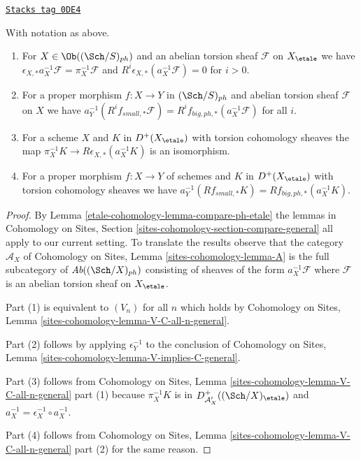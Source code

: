 \begin{lemma}
\label{etale-cohomology-lemma-V-C-all-n-etale-ph}
\href{https://stacks.math.columbia.edu/tag/0DE4}{\texttt{Stacks tag 0DE4}}

With notation as above.
\begin{enumerate}
\item For $X \in \Ob((\Sch/S)_{ph})$ and an abelian torsion sheaf $\mathcal{F}$
on $X_\etale$ we have
$\epsilon_{X, *}a_X^{-1}\mathcal{F} = \pi_X^{-1}\mathcal{F}$
and $R^i\epsilon_{X, *}(a_X^{-1}\mathcal{F}) = 0$ for $i > 0$.
\item For a proper morphism $f : X \to Y$ in $(\Sch/S)_{ph}$
and abelian torsion sheaf $\mathcal{F}$ on $X$ we have
$a_Y^{-1}(R^if_{small, *}\mathcal{F}) =
R^if_{big, ph, *}(a_X^{-1}\mathcal{F})$
for all $i$.
\item For a scheme $X$ and $K$ in $D^+(X_\etale)$ with torsion
cohomology sheaves the map
$\pi_X^{-1}K \to R\epsilon_{X, *}(a_X^{-1}K)$ is an isomorphism.
\item For a proper morphism $f : X \to Y$ of schemes
and $K$ in $D^+(X_\etale)$ with torsion cohomology sheaves we have
$a_Y^{-1}(Rf_{small, *}K) = Rf_{big, ph, *}(a_X^{-1}K)$.
\end{enumerate}
\end{lemma}

\begin{proof}
By Lemma \ref{etale-cohomology-lemma-compare-ph-etale} the lemmas in
Cohomology on Sites, Section \ref{sites-cohomology-section-compare-general}
all apply to our current setting. To translate the results
observe that the category $\mathcal{A}_X$ of
Cohomology on Sites, Lemma \ref{sites-cohomology-lemma-A}
is the full subcategory of $\textit{Ab}((\Sch/X)_{ph})$
consisting of sheaves of the form $a_X^{-1}\mathcal{F}$
where $\mathcal{F}$ is an abelian torsion sheaf on $X_\etale$.

\medskip\noindent
Part (1) is equivalent to $(V_n)$ for all $n$ which holds by
Cohomology on Sites, Lemma \ref{sites-cohomology-lemma-V-C-all-n-general}.

\medskip\noindent
Part (2) follows by applying $\epsilon_Y^{-1}$ to the conclusion of
Cohomology on Sites, Lemma \ref{sites-cohomology-lemma-V-implies-C-general}.

\medskip\noindent
Part (3) follows from Cohomology on Sites, Lemma
\ref{sites-cohomology-lemma-V-C-all-n-general} part (1)
because $\pi_X^{-1}K$ is in $D^+_{\mathcal{A}'_X}((\Sch/X)_\etale)$
and $a_X^{-1} = \epsilon_X^{-1} \circ a_X^{-1}$.

\medskip\noindent
Part (4) follows from Cohomology on Sites, Lemma
\ref{sites-cohomology-lemma-V-C-all-n-general} part (2)
for the same reason.
\end{proof}

